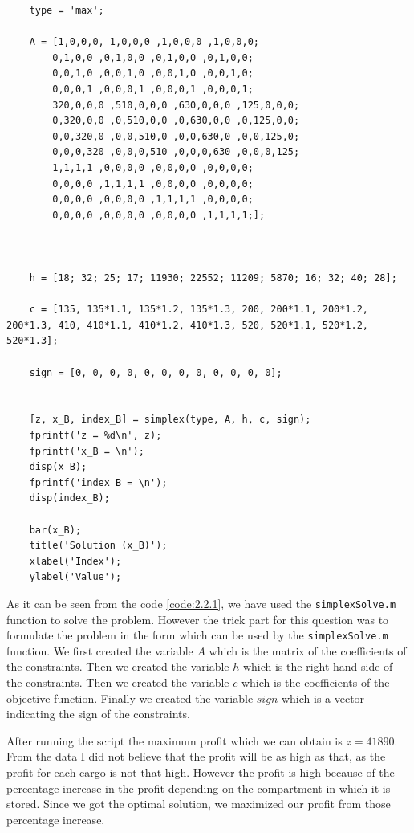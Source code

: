 \documentclass[unicode,11pt,a4paper,oneside,numbers=endperiod,openany]{scrartcl}
\begin{document}
\begin{lstlisting}
	type = 'max';

	A = [1,0,0,0, 1,0,0,0 ,1,0,0,0 ,1,0,0,0;
		0,1,0,0 ,0,1,0,0 ,0,1,0,0 ,0,1,0,0;
		0,0,1,0 ,0,0,1,0 ,0,0,1,0 ,0,0,1,0;
		0,0,0,1 ,0,0,0,1 ,0,0,0,1 ,0,0,0,1;
		320,0,0,0 ,510,0,0,0 ,630,0,0,0 ,125,0,0,0;
		0,320,0,0 ,0,510,0,0 ,0,630,0,0 ,0,125,0,0;
		0,0,320,0 ,0,0,510,0 ,0,0,630,0 ,0,0,125,0;
		0,0,0,320 ,0,0,0,510 ,0,0,0,630 ,0,0,0,125;
		1,1,1,1 ,0,0,0,0 ,0,0,0,0 ,0,0,0,0;
		0,0,0,0 ,1,1,1,1 ,0,0,0,0 ,0,0,0,0;
		0,0,0,0 ,0,0,0,0 ,1,1,1,1 ,0,0,0,0;
		0,0,0,0 ,0,0,0,0 ,0,0,0,0 ,1,1,1,1;];



	h = [18; 32; 25; 17; 11930; 22552; 11209; 5870; 16; 32; 40; 28];

	c = [135, 135*1.1, 135*1.2, 135*1.3, 200, 200*1.1, 200*1.2, 200*1.3, 410, 410*1.1, 410*1.2, 410*1.3, 520, 520*1.1, 520*1.2, 520*1.3];

	sign = [0, 0, 0, 0, 0, 0, 0, 0, 0, 0, 0, 0];


	[z, x_B, index_B] = simplex(type, A, h, c, sign);
	fprintf('z = %d\n', z);
	fprintf('x_B = \n');
	disp(x_B);
	fprintf('index_B = \n');
	disp(index_B);

	bar(x_B);
	title('Solution (x_B)');
	xlabel('Index');
	ylabel('Value');
\end{lstlisting}
\label{code:2.2.1}

As it can be seen from the code \ref{code:2.2.1}, we have used the \texttt{simplexSolve.m} function to solve the problem. However the trick part for this question was to formulate the problem in the form which can be used by the \texttt{simplexSolve.m} function. We first created the variable $A$ which is the matrix of the coefficients of the constraints. Then we created the variable $h$ which is the right hand side of the constraints. Then we created the variable $c$ which is the coefficients of the objective function. Finally we created the variable $sign$ which is a vector indicating the sign of the constraints.

After running the script the maximum profit which we can obtain is $z =  41890$. From the data I did not believe that the profit will be as high as that, as the profit for each cargo is not that high. However the profit is high because of the percentage increase in the profit depending on the compartment in which it is stored. Since we got the optimal solution, we maximized our profit from those percentage increase. 
\end{document}
